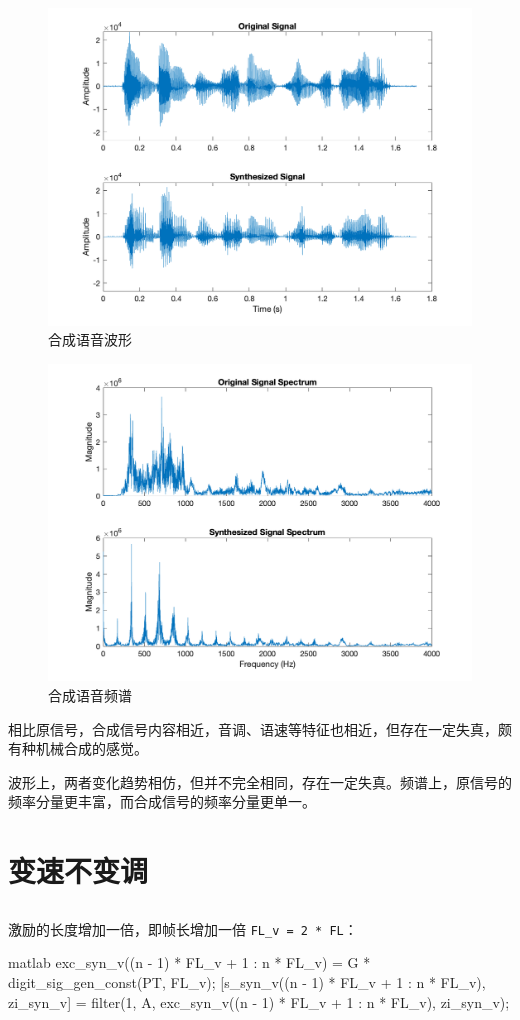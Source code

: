 \documentclass[a4paper]{article}  %
\begin{document}
\begin{figure}[ht]
    \centering
    \includegraphics[width=.6\textwidth]{asserts/1_10_synthesized_signal_t.png}
    \caption{
        合成语音波形
    }\label{fig:1_10_synthesized_signal_t}
\end{figure}

\begin{figure}[ht]
    \centering
    \includegraphics[width=.6\textwidth]{asserts/1_10_synthesized_signal_f.png}
    \caption{
        合成语音频谱
    }\label{fig:1_10_synthesized_signal_f}
\end{figure}

相比原信号，合成信号内容相近，音调、语速等特征也相近，但存在一定失真，颇有种机械合成的感觉。

波形上，两者变化趋势相仿，但并不完全相同，存在一定失真。频谱上，原信号的频率分量更丰富，而合成信号的频率分量更单一。

\section{变速不变调}

\subsection{}

激励的长度增加一倍，即帧长增加一倍 \texttt{FL\_v = 2 * FL}：
\begin{codeblock}{matlab}
exc_syn_v((n - 1) * FL_v + 1 : n * FL_v) = G * digit_sig_gen_const(PT, FL_v);
[s_syn_v((n - 1) * FL_v + 1 : n * FL_v), zi_syn_v] = filter(1, A, exc_syn_v((n - 1) * FL_v + 1 : n * FL_v), zi_syn_v);
\end{codeblock}
\end{document}
